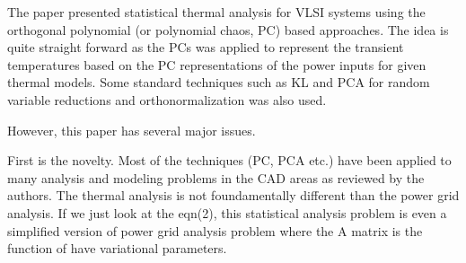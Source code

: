 \begin{reviewer}
The paper presented statistical thermal analysis for VLSI systems using the orthogonal polynomial  (or polynomial chaos, PC) based approaches. The idea is quite straight forward as the PCs was applied to represent the transient temperatures based on the PC representations of the power inputs for given thermal models. Some standard techniques such as KL and PCA for random variable reductions and orthonormalization was also used.

However, this paper has several major issues.

First is the novelty. Most of the techniques (PC, PCA etc.) have been applied to many analysis and modeling problems in the CAD areas as reviewed by the authors. The thermal analysis is not foundamentally different than the power grid analysis.  If we just look at the eqn(2), this statistical analysis problem is even a simplified version of power grid analysis problem where the A matrix is the function of have variational parameters.
\end{reviewer}
